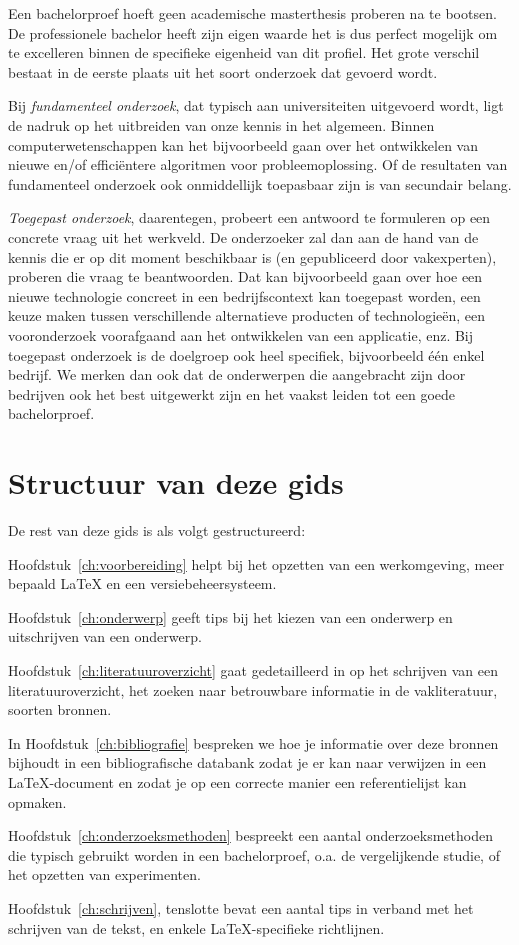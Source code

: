 Een bachelorproef hoeft geen academische masterthesis proberen na te bootsen. De professionele bachelor heeft zijn eigen waarde het is dus perfect mogelijk om te excelleren binnen de specifieke eigenheid van dit profiel. Het grote verschil bestaat in de eerste plaats uit het soort onderzoek dat gevoerd wordt.

Bij \emph{fundamenteel onderzoek}, dat typisch aan universiteiten uitgevoerd wordt, ligt de nadruk op het uitbreiden van onze kennis in het algemeen. Binnen computerwetenschappen kan het bijvoorbeeld gaan over het ontwikkelen van nieuwe en/of efficiëntere algoritmen voor probleemoplossing. Of de resultaten van fundamenteel onderzoek ook onmiddellijk toepasbaar zijn is van secundair belang.

\emph{Toegepast onderzoek}, daarentegen, probeert een antwoord te formuleren op een concrete vraag uit het werkveld. De onderzoeker zal dan aan de hand van de kennis die er op dit moment beschikbaar is (en gepubliceerd door vakexperten), proberen die vraag te beantwoorden. Dat kan bijvoorbeeld gaan over hoe een nieuwe technologie concreet in een bedrijfscontext kan toegepast worden, een keuze maken tussen verschillende alternatieve producten of technologieën, een vooronderzoek voorafgaand aan het ontwikkelen van een applicatie, enz. Bij toegepast onderzoek is de doelgroep ook heel specifiek, bijvoorbeeld één enkel bedrijf. We merken dan ook dat de onderwerpen die aangebracht zijn door bedrijven ook het best uitgewerkt zijn en het vaakst leiden tot een goede bachelorproef.

\section{Structuur van deze gids}
\label{sec:structuur}

De rest van deze gids is als volgt gestructureerd:

Hoofdstuk~\ref{ch:voorbereiding} helpt bij het opzetten van een werkomgeving, meer bepaald {\LaTeX} en een versiebeheersysteem.

Hoofdstuk~\ref{ch:onderwerp} geeft tips bij het kiezen van een onderwerp en uitschrijven van een onderwerp.

Hoofdstuk~\ref{ch:literatuuroverzicht} gaat gedetailleerd in op het schrijven van een literatuuroverzicht, het zoeken naar betrouwbare informatie in de vakliteratuur, soorten bronnen.

In Hoofdstuk~\ref{ch:bibliografie} bespreken we hoe je informatie over deze bronnen bijhoudt in een bibliografische databank zodat je er kan naar verwijzen in een {\LaTeX}-document en zodat je op een correcte manier een referentielijst kan opmaken.

Hoofdstuk~\ref{ch:onderzoeksmethoden} bespreekt een aantal onderzoeksmethoden die typisch gebruikt worden in een bachelorproef, o.a. de vergelijkende studie, of het opzetten van experimenten.

Hoofdstuk~\ref{ch:schrijven}, tenslotte bevat een aantal tips in verband met het schrijven van de tekst, en enkele {\LaTeX}-specifieke richtlijnen.
